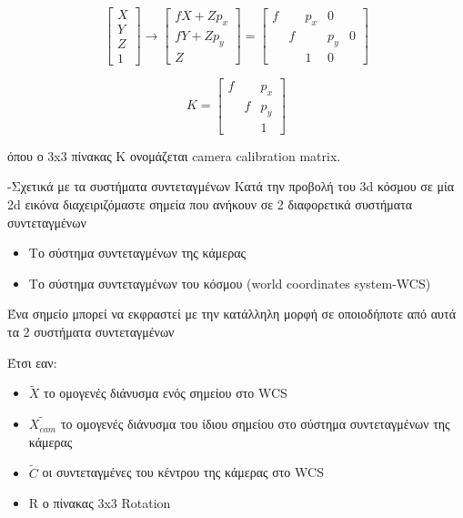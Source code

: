 \begin{equation}
\begin{bmatrix}
X\\ 
Y\\
Z\\
1
\end{bmatrix}
\rightarrow
\begin{bmatrix}
fX+Zp_{x}\\
fY+Zp_{y}\\
Z
\end{bmatrix}
=
\begin{bmatrix}
f & & p_{x} & 0\\
 & f & & p_{y} & 0\\
 & & 1 & 0
\end{bmatrix}
\end{equation}


\begin{equation}
K=
\begin{bmatrix}
f &  & p_{x}\\
 & f & p_{y}\\
 & & 1
\end{bmatrix}
\end{equation}

όπου ο 3x3 πίνακας Κ  ονομάζεται camera calibration matrix.


-Σχετικά με τα συστήματα συντεταγμένων
Κατά την προβολή του 3d κόσμου σε μία 2d εικόνα διαχειριζόμαστε σημεία που ανήκουν σε 2 διαφορετικά συστήματα συντεταγμένων

\begin{itemize}
\item Το σύστημα συντεταγμένων της κάμερας 
\item Το σύστημα συντεταγμένων του κόσμου (world coordinates system-WCS)
\end{itemize}


Ένα σημείο μπορεί να εκφραστεί με την κατάλληλη μορφή σε οποιοδήποτε από αυτά τα 2 συστήματα συντεταγμένων

Έτσι εαν:

\begin{itemize}
\item $\tilde{X}$ το ομογενές διάνυσμα ενός σημείου στο WCS
\item $\tilde{X_{cam}}$ το ομογενές διάνυσμα του ίδιου σημείου στο σύστημα συντεταγμένων της κάμερας
\item $\tilde{C}$ οι συντεταγμένες του κέντρου της κάμερας στο WCS
\item R ο πίνακας 3x3 Rotation
\end{itemize}

